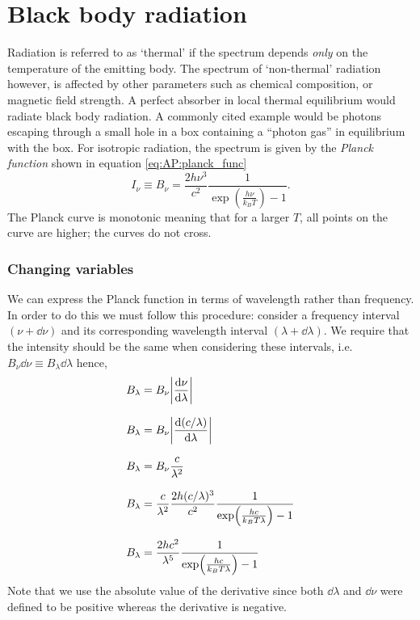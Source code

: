 \section{Black body radiation}
Radiation is referred to as `thermal' if the spectrum depends \emph{only} on the temperature of the emitting body.
 The spectrum of `non-thermal' radiation however, is affected by other parameters such as chemical composition, or magnetic field strength.
 A perfect absorber in local thermal equilibrium would radiate black body radiation.
 A commonly cited example would be photons escaping through a small hole in a box containing a ``photon gas'' in equilibrium with the box.
 For isotropic radiation, the spectrum is given by the \emph{Planck function} shown in equation \ref{eq:AP:planck_func}
%
\begin{equation}
	I_\nu \equiv B_\nu = \frac{2 h \nu ^3}{c^2} \frac{1}{\exp(\frac{h \nu}{k_B T}) - 1}.
	\label{eq:AP:planck_func}
\end{equation}
%
The Planck curve is monotonic meaning that for a larger \(T\), all points on the curve are higher; the curves do not cross.
%
\subsubsection{Changing variables}
We can express the Planck function in terms of wavelength rather than frequency.
 In order to do this we must follow this procedure:
 consider a frequency interval \((\nu + \dd{\nu})\) and its corresponding wavelength interval \((\lambda + \dd{\lambda})\).
 We require that the intensity should be the same when considering these intervals, i.e.\ \(B_\nu \dd{\nu} \equiv B_\lambda \dd{\lambda}\) hence,
%
\begin{align}
	B_\lambda &= B_\nu \abs{\dv{\nu}{\lambda}}				\nonumber 
	\linedrop
	B_\lambda &= B_\nu \abs{\dv{(c/\lambda)}{\lambda}}		\nonumber
	\linedrop
	B_\lambda &= B_\nu \frac{c}{\lambda^2}					\nonumber
	\linedrop
	B_\lambda &= \frac{c}{\lambda^2} \frac{2 h (c/\lambda)^3}{c^2} \frac{1}{\exp(\frac{h c}{k_B T \lambda}) - 1} \nonumber
	\linedrop
	B_\lambda &= \frac{2 h c^2}{\lambda^5} \frac{1}{\exp(\frac{h c}{k_B T \lambda}) - 1}
\end{align}
%
Note that we use the absolute value of the derivative since both \(\dd{\lambda}\) and \(\dd{\nu}\) were defined to be positive whereas the derivative is negative.            
%
